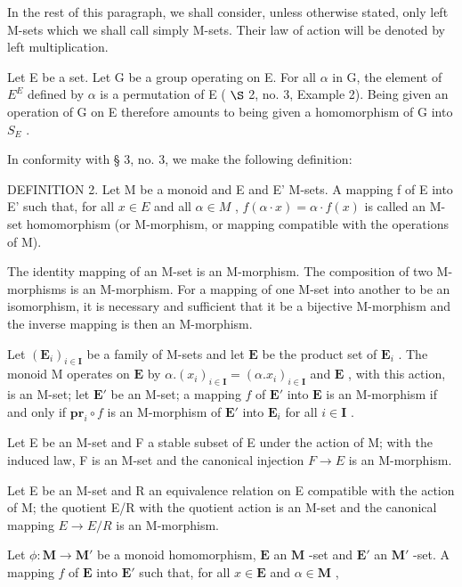 In the rest of this paragraph, we shall consider, unless otherwise stated, only left M-sets which we shall call simply M-sets. Their law of action will be denoted by left multiplication.

Let E be a set. Let G be a group operating on E. For all \(\alpha\) in G, the element of \(E^{E}\) defined by \(\alpha\) is a permutation of E ( \(\S\) 2, no. 3, Example 2). Being given an operation of G on E therefore amounts to being given a homomorphism of G into \(S_{E}\) .

In conformity with § 3, no. 3, we make the following definition:

DEFINITION 2. Let M be a monoid and E and E' M-sets. A mapping f of E into E' such that, for all \(x \in E\) and all \(\alpha \in M\) , \(f(\alpha \cdot x) = \alpha \cdot f(x)\) is called an M-set homomorphism (or M-morphism, or mapping compatible with the operations of M).

The identity mapping of an M-set is an M-morphism. The composition of two M-morphisms is an M-morphism. For a mapping of one M-set into another to be an isomorphism, it is necessary and sufficient that it be a bijective M-morphism and the inverse mapping is then an M-morphism.

Let \((\mathbf{E}_i)_{i\in \mathbf{I}}\) be a family of M-sets and let \(\mathbf{E}\) be the product set of \(\mathbf{E}_i\) . The monoid M operates on \(\mathbf{E}\) by \(\alpha .(x_i)_{i\in \mathbf{I}} = (\alpha .x_i)_{i\in \mathbf{I}}\) and \(\mathbf{E}\) , with this action, is an M-set; let \(\mathbf{E}'\) be an M-set; a mapping \(f\) of \(\mathbf{E}'\) into \(\mathbf{E}\) is an M-morphism if and only if \(\mathbf{pr}_i\circ f\) is an M-morphism of \(\mathbf{E}'\) into \(\mathbf{E}_i\) for all \(i\in \mathbf{I}\) .

Let E be an M-set and F a stable subset of E under the action of M; with the induced law, F is an M-set and the canonical injection \(F \rightarrow E\) is an M-morphism.

Let E be an M-set and R an equivalence relation on E compatible with the action of M; the quotient E/R with the quotient action is an M-set and the canonical mapping \(E \rightarrow E/R\) is an M-morphism.

Let \(\phi: \mathbf{M} \to \mathbf{M}'\) be a monoid homomorphism, \(\mathbf{E}\) an \(\mathbf{M}\) -set and \(\mathbf{E}'\) an \(\mathbf{M}'\) -set. A mapping \(f\) of \(\mathbf{E}\) into \(\mathbf{E}'\) such that, for all \(x \in \mathbf{E}\) and \(\alpha \in \mathbf{M}\) ,

